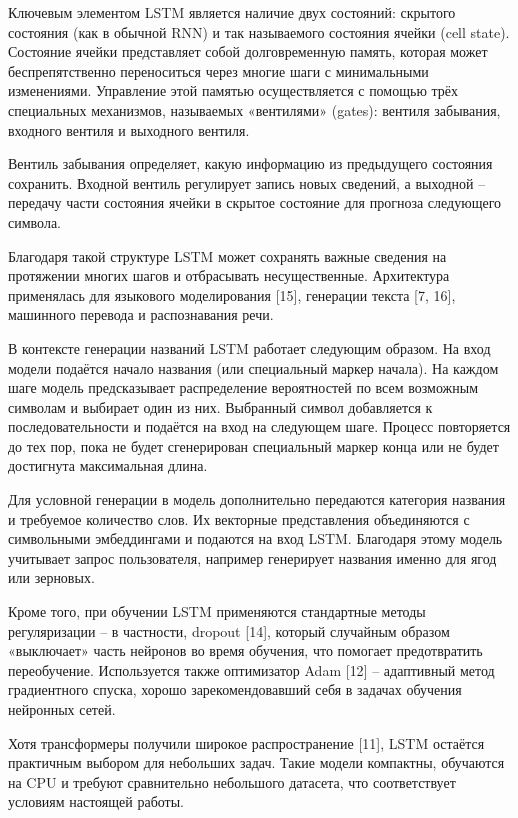 Ключевым элементом LSTM является наличие двух состояний: скрытого состояния (как в обычной RNN) и так называемого состояния ячейки (cell state). Состояние ячейки представляет собой долговременную память, которая может беспрепятственно переноситься через многие шаги с минимальными изменениями. Управление этой памятью осуществляется с помощью трёх специальных механизмов, называемых «вентилями» (gates): вентиля забывания, входного вентиля и выходного вентиля.

Вентиль забывания определяет, какую информацию из предыдущего состояния сохранить. Входной вентиль регулирует запись новых сведений, а выходной -- передачу части состояния ячейки в скрытое состояние для прогноза следующего символа.

Благодаря такой структуре LSTM может сохранять важные сведения на протяжении многих шагов и отбрасывать несущественные. Архитектура применялась для языкового моделирования {[}15{]}, генерации текста {[}7, 16{]}, машинного перевода и распознавания речи.

В контексте генерации названий LSTM работает следующим образом. На вход модели подаётся начало названия (или специальный маркер начала). На каждом шаге модель предсказывает распределение вероятностей по всем возможным символам и выбирает один из них. Выбранный символ добавляется к последовательности и подаётся на вход на следующем шаге. Процесс повторяется до тех пор, пока не будет сгенерирован специальный маркер конца или не будет достигнута максимальная длина.

Для условной генерации в модель дополнительно передаются категория названия и требуемое количество слов. Их векторные представления объединяются с символьными эмбеддингами и подаются на вход LSTM. Благодаря этому модель учитывает запрос пользователя, например генерирует названия именно для ягод или зерновых.

Кроме того, при обучении LSTM применяются стандартные методы регуляризации -- в частности, dropout {[}14{]}, который случайным образом «выключает» часть нейронов во время обучения, что помогает предотвратить переобучение. Используется также оптимизатор Adam {[}12{]} -- адаптивный метод градиентного спуска, хорошо зарекомендовавший себя в задачах обучения нейронных сетей.

Хотя трансформеры получили широкое распространение {[}11{]}, LSTM остаётся практичным выбором для небольших задач. Такие модели компактны, обучаются на CPU и требуют сравнительно небольшого датасета, что соответствует условиям настоящей работы.

